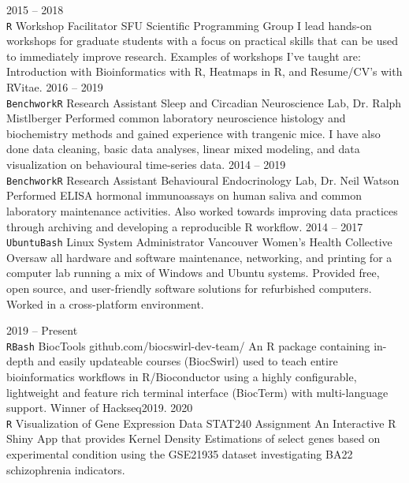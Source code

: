 \documentclass[9pt]{developercv} %
\begin{document}
\vspace{-1em}
\vspace{-.25em}
\begin{entrylist}
	\entry
		{2015 -- 2018\\\footnotesize\texttt{R}}
		{Workshop Facilitator}
		{SFU Scientific Programming Group}
		{I lead hands-on workshops for graduate students with a focus on practical skills that can be used to immediately improve research. Examples of workshops I've taught are: Introduction with Bioinformatics with R, Heatmaps in R, and Resume/CV's with RVitae.}
	\entry
		{2016 -- 2019\\\footnotesize\texttt{Benchwork}\slashsep\texttt{R}}
		{Research Assistant}
		{Sleep and Circadian Neuroscience Lab, Dr. Ralph Mistlberger}
		{Performed common laboratory neuroscience histology and biochemistry methods and gained experience with trangenic mice. I have also done data cleaning, basic data analyses, linear mixed modeling, and data visualization on behavioural time-series data.}
	\entry
		{2014 -- 2019\\\footnotesize\texttt{Benchwork}\slashsep\texttt{R}}
		{Research Assistant}
		{Behavioural Endocrinology Lab, Dr. Neil Watson}
		{Performed ELISA hormonal immunoassays on human saliva and common laboratory maintenance activities. Also worked towards improving data practices through archiving and developing a reproducible R workflow. }
	\entry
		{2014 -- 2017\\\footnotesize\texttt{Ubuntu}\slashsep\texttt{Bash}}
		{Linux System Administrator}
		{Vancouver Women's Health Collective}
		{Oversaw all hardware and software maintenance, networking, and printing for a computer lab running a mix of Windows and Ubuntu systems. Provided free, open source, and user-friendly software solutions for refurbished computers. Worked in a cross-platform environment.}
\end{entrylist}
\vspace{-2em}
\vspace{-.25em}
\begin{entrylist}
	\entry
		{2019 -- Present\\\footnotesize\texttt{R}\slashsep\texttt{Bash}}
		{BiocTools}
		{github.com/biocswirl-dev-team/}
		{An R package containing in-depth and easily updateable courses (BiocSwirl) used to teach entire bioinformatics workflows in R/Bioconductor using a highly configurable, lightweight and feature rich terminal interface (BiocTerm) with multi-language support. Winner of Hackseq2019.}
	\entry
		{2020\\\footnotesize\texttt{R}}
		{Visualization of Gene Expression Data}
		{STAT240 Assignment}
		{An Interactive R Shiny App that provides Kernel Density Estimations of select genes based on experimental condition using the GSE21935 dataset investigating BA22 schizophrenia indicators.}
\end{entrylist}
\end{document}
